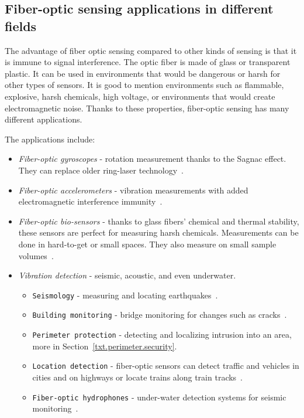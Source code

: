 \subsection{Fiber-optic sensing applications in different fields}\label{txt.sensing.usage}

The advantage of fiber optic sensing compared to other kinds of sensing is that it is immune to signal interference. The optic fiber is made of glass or transparent plastic. It can be used in environments that would be dangerous or harsh for other types of sensors. It is good to mention environments such as flammable, explosive, harsh chemicals, high voltage, or environments that would create electromagnetic noise. Thanks to these properties, fiber-optic sensing has many different applications.

The applications include:

\begin{itemize}
    \item \textit{Fiber-optic gyroscopes} - rotation measurement thanks to the Sagnac effect. They can replace older ring-laser technology~\cite{fog}.
    \item \textit{Fiber-optic accelerometers} - vibration measurements with added electromagnetic interference immunity~\cite{accelerometer}. 
    \item \textit{Fiber-optic bio-sensors} - thanks to glass fibers' chemical and thermal stability, these sensors are perfect for measuring harsh chemicals. Measurements can be done in hard-to-get or small spaces. They also measure on small sample volumes~\cite{chemsens}.
    \item \textit{Vibration detection} - seismic, acoustic,  and even underwater.
    \begin{itemize}
        \item \texttt{Seismology} - measuring and locating earthquakes~\cite{dasKislov}.
        \item \texttt{Building monitoring} - bridge monitoring for changes such as cracks~\cite{DVSShanFu}.
        \item \texttt{Perimeter protection} - detecting and localizing intrusion into an area, more in Section~\ref{txt.perimeter.security}.
        \item \texttt{Location detection} - fiber-optic sensors can detect traffic and vehicles in cities and on highways or locate trains along train tracks~\cite{dasKislov}.
        \item \texttt{Fiber-optic hydrophones} - under-water detection systems for seismic monitoring~\cite{hydrophones}.
    \end{itemize}
\end{itemize}

